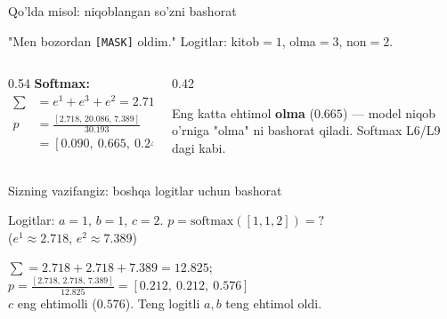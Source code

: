 \documentclass[aspectratio=169,11pt]{beamer}
\begin{document}
\begin{frame}{Qo'lda misol: niqoblangan so'zni bashorat}
  \begin{tcolorbox}[defbox,title={\texttt{[MASK]} uchun logitlar (3 so'zli lug'at)}]
    \small "Men bozordan \texttt{[MASK]} oldim." Logitlar: kitob$=1$, olma$=3$, non$=2$.
  \end{tcolorbox}
  \vspace{0.2em}
  \begin{columns}[T]
    \begin{column}{0.54\textwidth}
      \textbf{Softmax:}
      \begin{align*}
        \textstyle\sum &= e^1{+}e^3{+}e^2 = 2.718{+}20.086{+}7.389 = 30.193\\
        p &= \tfrac{[2.718,\,20.086,\,7.389]}{30.193}\\
          &= [0.090,\ \mathbf{0.665},\ 0.245]
      \end{align*}
    \end{column}
    \begin{column}{0.42\textwidth}
      \begin{tcolorbox}[okbox,top=2pt,bottom=2pt]
        \footnotesize
        Eng katta ehtimol \textbf{olma} ($0.665$) --- model niqob o'rniga
        "olma" ni bashorat qiladi. Softmax L6/L9 dagi kabi.
      \end{tcolorbox}
    \end{column}
  \end{columns}
\end{frame}

\begin{frame}{Sizning vazifangiz: boshqa logitlar uchun bashorat}
  \begin{tcolorbox}[warnbox,title=Savol --- 60 soniya]
    \small
    Logitlar: $a=1$, $b=1$, $c=2$. \quad
    \textbf{\large $p = \mathrm{softmax}([1,1,2]) = ?$}\\[2pt]
    \footnotesize ($e^1\approx 2.718$, $e^2\approx 7.389$)
  \end{tcolorbox}
  \pause
  \begin{tcolorbox}[okbox,title=Javob]
    \small
    $\textstyle\sum = 2.718+2.718+7.389 = 12.825$; \quad
    $p = \tfrac{[2.718,\,2.718,\,7.389]}{12.825} = [0.212,\ 0.212,\ \mathbf{0.576}]$\\[3pt]
    \footnotesize $c$ eng ehtimolli ($0.576$). Teng logitli $a,b$ teng ehtimol oldi.
  \end{tcolorbox}
\end{frame}
\end{document}
